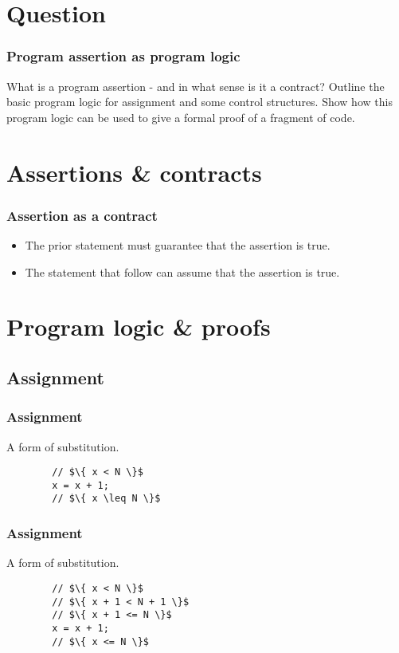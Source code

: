 
\section{Question}

\begin{frame}
    \frametitle{Program assertion as program logic}

    What is a program assertion - and in what sense is it a contract? Outline
    the basic program logic for assignment and some control structures. Show
    how this program logic can be used to give a formal proof of a fragment of
    code.
\end{frame}

\section{Assertions \& contracts}



\begin{frame}
    \frametitle{Assertion as a contract}
    \begin{itemize}
    \item The prior statement must guarantee that the assertion is true.
    \pause \item The statement that follow can assume that the assertion is true.
    \end{itemize}
\end{frame}

\section{Program logic \& proofs}

\subsection{Assignment}

\begin{frame}[fragile]
    \frametitle{Assignment}
    A form of substitution.
    \begin{verbatim}
        // $\{ x < N \}$
        x = x + 1;
        // $\{ x \leq N \}$
    \end{verbatim}
\end{frame}

\begin{frame}[fragile]
    \frametitle{Assignment}
    A form of substitution.
    \begin{verbatim}
        // $\{ x < N \}$
        // $\{ x + 1 < N + 1 \}$
        // $\{ x + 1 <= N \}$
        x = x + 1;
        // $\{ x <= N \}$
    \end{verbatim}
\end{frame}

